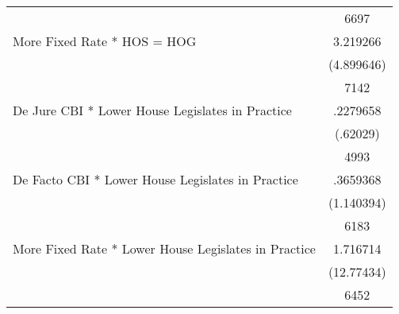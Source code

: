 {\begin{longtable}{l*{1}{c}}
                    &        6697\\
More Fixed Rate * HOS = HOG&    3.219266\\
                    &  (4.899646)\\
                    &        7142\\
De Jure CBI * Lower House Legislates in Practice&    .2279658\\
                    &    (.62029)\\
                    &        4993\\
De Facto CBI * Lower House Legislates in Practice&    .3659368\\
                    &  (1.140394)\\
                    &        6183\\
More Fixed Rate * Lower House Legislates in Practice&    1.716714\\
                    &  (12.77434)\\
                    &        6452\\
\hline\hline
\end{longtable}
}
